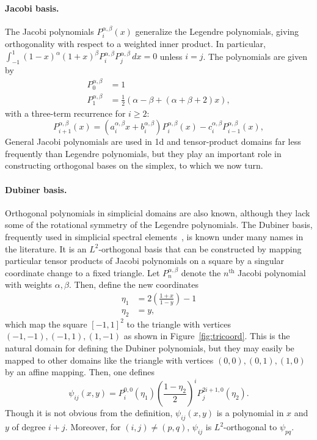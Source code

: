 \paragraph{Jacobi basis.}
The Jacobi polynomials $P^{\alpha,\beta}_i(x)$ generalize the Legendre
polynomials, giving orthogonality with respect to a weighted inner
product.  In particular, $\int_{-1}^1 (1-x)^\alpha (1+x)^\beta
P^{\alpha,\beta}_i P^{\alpha,\beta}_j \, dx = 0$ unless $i=j$.
The polynomials are given by
\begin{equation}
\label{eq:firsttwojacobi}
\begin{split}
P_0^{\alpha,\beta} & = 1 \\
P_1^{\alpha,\beta} &
= \frac{1}{2}\left( \alpha - \beta + \left( \alpha + \beta + 2 \right)
x \right),
\end{split}
\end{equation}
with a three-term recurrence for $i\geq2$:
\begin{equation}
\label{eq:recur}
P_{i+1}^{\alpha,\beta}(x)
= (a^{\alpha,\beta}_i x + b^{\alpha,\beta}_i) P_i^{\alpha,\beta}(x) - c^{\alpha,\beta}_i P_{i-1}^{\alpha,\beta}(x),
\end{equation}
General Jacobi polynomials are used in 1d and tensor-product domains far
less frequently than Legendre polynomials, but they play an important role
in constructing orthogonal bases on the simplex, to which we now turn.


\paragraph{Dubiner basis.}
Orthogonal polynomials in simplicial domains are also known,
although they lack some of the rotational symmetry of the Legendre
polynomials.  The Dubiner basis, frequently used in simplicial spectral
elements~\citep{Dubiner1991}, is known under many names in the literature.
It is an $L^2$-orthogonal basis that can be constructed by mapping
particular tensor products of Jacobi polynomials on a square by a singular
coordinate change to a fixed triangle.  Let $P^{\alpha,\beta}_n$
denote the $n^\mathrm{th}$ Jacobi polynomial with weights $\alpha,
\beta$.  Then, define the new coordinates
\begin{equation}
\label{eq:dubcoord}
\begin{split}
\eta_1 & = 2\left(\frac{1+x}{1-y}\right)-1 \\
\eta_2 & = y,
\end{split}
\end{equation}
which map the square $[-1,1]^2$ to the triangle with vertices
$(-1,-1),(-1,1),(1,-1)$ as shown in Figure~\ref{fig:tricoord}.  This is
the natural domain for defining the Dubiner polynomials, but they may
easily be mapped to other domains like the triangle with vertices
$(0,0) , (0,1) , (1,0)$ by an affine mapping.
Then, one defines
\begin{equation}
\psi_{ij}(x,y) = P_i^{0,0}(\eta_1) \left( \frac{1-\eta_2}{2}
\right)^i P_j^{2i+1,0}(\eta_2).
\end{equation}
Though it is not obvious from the definition, $\psi_{ij}(x,y)$ is
a polynomial in $x$ and $y$ of degree $i + j$.  Moreover,
for $(i,j) \neq (p,q)$, $\psi_{ij}$ is $L^2$-orthogonal to
$\psi_{pq}$.

